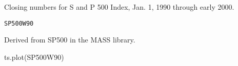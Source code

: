 \begin{Description}\relax
Closing numbers for S and P 500 Index, Jan. 1, 1990 through
early 2000.
\end{Description}
\begin{Usage}
\begin{verbatim}SP500W90\end{verbatim}
\end{Usage}
\begin{Source}\relax
Derived from SP500 in the MASS library.
\end{Source}
\begin{Examples}
\begin{ExampleCode}
ts.plot(SP500W90)
\end{ExampleCode}
\end{Examples}

